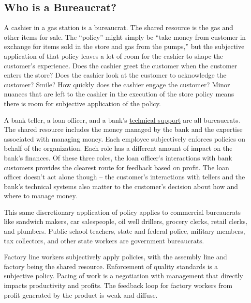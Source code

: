 \subsection*{Who is a Bureaucrat?}

A cashier in a gas station is a bureaucrat. 
The shared resource is the gas and other items for sale. The ``policy'' might simply be ``take money from customer in exchange for items sold in the store and gas from the pumps,'' but the subjective application of that policy leaves a lot of room for the cashier to shape the customer's experience. Does the cashier greet the customer when the customer enters the store? Does the cashier look at the customer to acknowledge the customer? Smile? How quickly does the cashier engage the customer? Minor nuances that are left to the cashier in the execution of the store policy means there is room for subjective application of the policy. 

A bank teller, a loan officer, and a bank's \href{https://en.wikipedia.org/wiki/Technical_support}{technical support} are all bureaucrats. 
The shared resource includes the money managed by the bank and the expertise associated with managing money. Each employee subjectively enforces policies on behalf of the organization. Each role has a different amount of impact on the bank's finances. Of these three roles, the loan officer's interactions with bank customers provides the clearest route for feedback based on profit. The loan officer doesn't act alone though -- the customer's interactions with tellers and the bank's technical systems also matter to the customer's decision about how and where to manage money. 


This same discretionary application of policy applies to commercial bureaucrats like sandwich makers, car salespeople, oil well drillers, grocery clerks, retail clerks, 
and plumbers. Public school teachers, state and federal police, 
military members, 
tax collectors, and other state workers are government bureaucrats. 


Factory line workers subjectively apply policies, with the assembly line and factory being the shared resource. Enforcement of quality standards is a subjective policy. Pacing of work is a negotiation with management that directly impacts productivity and profits. The feedback loop for factory workers from profit generated by the product is weak and diffuse. %

